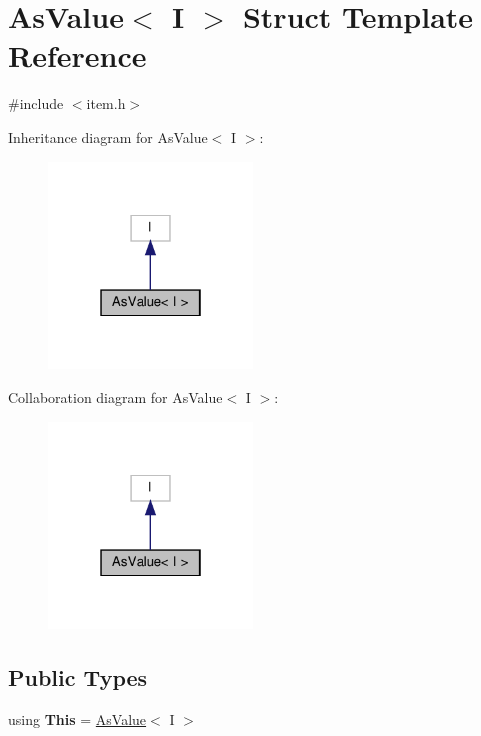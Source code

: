 \hypertarget{structAsValue}{}\section{As\+Value$<$ I $>$ Struct Template Reference}
\label{structAsValue}


{\ttfamily \#include $<$item.\+h$>$}



Inheritance diagram for As\+Value$<$ I $>$\+:\nopagebreak
\begin{figure}[H]
\begin{center}
\leavevmode
\includegraphics[width=154pt]{structAsValue__inherit__graph}
\end{center}
\end{figure}


Collaboration diagram for As\+Value$<$ I $>$\+:\nopagebreak
\begin{figure}[H]
\begin{center}
\leavevmode
\includegraphics[width=154pt]{structAsValue__coll__graph}
\end{center}
\end{figure}
\subsection*{Public Types}
\begin{DoxyCompactItemize}
\item 
\mbox{\label{structAsValue_ac193a16f2751f437dc0a6d2835cb89e5}} 
using {\bfseries This} = \hyperlink{structAsValue}{As\+Value}$<$ I $>$
\end{DoxyCompactItemize}

